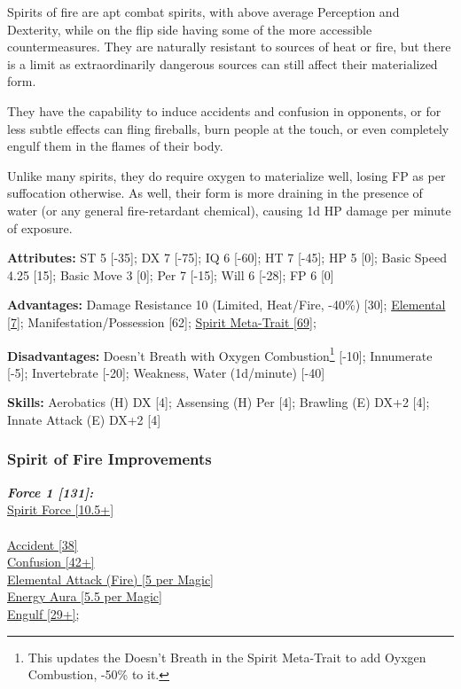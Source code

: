 \begin{multicols*}{3}
	Spirits of fire are apt combat spirits, with above average Perception and Dexterity, while on the flip side having some of the more accessible countermeasures. They are naturally resistant to sources of heat or fire, but there is a limit as extraordinarily dangerous sources can still affect their materialized form.
	
	They have the capability to induce accidents and confusion in opponents, or for less subtle effects can fling fireballs, burn people at the touch, or even completely engulf them in the flames of their body.
	
	Unlike many spirits, they do require oxygen to materialize well, losing FP as per suffocation otherwise. As well, their form is more draining in the presence of water (or any general fire-retardant chemical), causing 1d HP damage per minute of exposure.
	
	\textbf{Attributes:}
	ST 5 [-35]; DX 7 [-75]; IQ 6 [-60]; HT 7 [-45]; HP 5 [0]; Basic Speed 4.25 [15]; Basic Move 3 [0]; Per 7 [-15]; Will 6 [-28]; FP 6 [0]
	
	\textbf{Advantages:}
	Damage Resistance 10 (Limited, Heat/Fire, -40\%) [30]; \hyperref[elemental]{Elemental [7]}; Manifestation/Possession [62]; \hyperref[spirit_meta_trait]{Spirit Meta-Trait [69]};
	
	\textbf{Disadvantages:}
	Doesn't Breath with Oxygen Combustion\footnote{This updates the Doesn't Breath in the Spirit Meta-Trait to add Oyxgen Combustion, -50\% to it.} [-10]; Innumerate [-5]; Invertebrate [-20]; Weakness, Water (1d/minute) [-40]
	
	\textbf{Skills:}
	Aerobatics (H) DX [4]; Assensing (H) Per [4]; Brawling (E) DX+2 [4]; Innate Attack (E) DX+2 [4]
	
	\subsubsection*{Spirit of Fire Improvements}
	
	\textbf{\textit{Force 1 [131]:\\}}
	\hyperref[spirit_force]{Spirit Force [10.5+]}\\\\
	\hyperref[accident]{Accident [38]}\\
	\hyperref[confusion]{Confusion [42+]}\\
	\hyperref[elemental_attack]{Elemental Attack (Fire) [5 per Magic]}\\
	\hyperref[energy_aura]{Energy Aura [5.5 per Magic]}\\
	\hyperref[engulf]{Engulf [29+];}\\
	

\end{multicols*}
